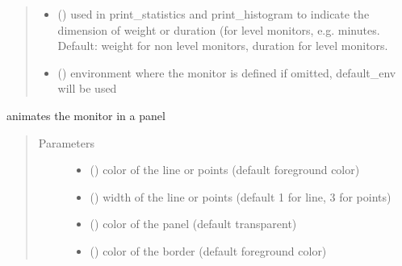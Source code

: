 \documentclass[letterpaper,10pt,english]{sphinxmanual}
\begin{document}
\begin{fulllineitems}
\begin{quote}
\begin{description}
\begin{itemize}
\item {} 
 () \textendash{} used in print\_statistics and print\_histogram to indicate the dimension of weight or duration (for
level monitors, e.g. minutes. Default: weight for non level monitors, duration for level monitors.

\item {} 
 ({\hyperref[\detokenize{Reference:salabim.Environment}]{}}) \textendash{} environment where the monitor is defined 
if omitted, default\_env will be used

\end{itemize}

\end{description}\end{quote}

\begin{fulllineitems}
\label{\detokenize{Reference:salabim.Monitor.animate}}
animates the monitor in a panel
\begin{quote}\begin{description}
\item[{Parameters}] \leavevmode\begin{itemize}
\item {} 
 () \textendash{} color of the line or points (default foreground color)

\item {} 
 () \textendash{} width of the line or points (default 1 for line, 3 for points)

\item {} 
 () \textendash{} color of the panel (default transparent)

\item {} 
 () \textendash{} color of the border (default foreground color)


\end{itemize}
\end{description}
\end{quote}
\end{fulllineitems}
\end{fulllineitems}
\end{document}
